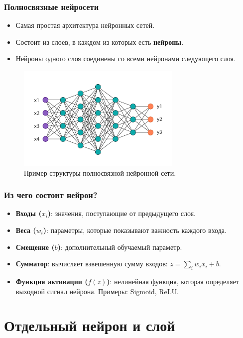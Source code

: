 \documentclass[notheorems, handout]{beamer}
\begin{document}
\begin{frame}
    \frametitle{Полносвязные нейросети}
    \begin{itemize}
        \item Самая простая архитектура нейронных сетей.
        \item Состоит из слоев, в каждом из которых есть \textbf{нейроны}.
        \item Нейроны одного слоя соединены со всеми нейронами следующего слоя.
    \end{itemize}
    \begin{figure}
        \includegraphics[width=0.7\textwidth]{img/fnn.png}
        \caption{Пример структуры полносвязной нейронной сети.}
    \end{figure}
\end{frame}

\begin{frame}
    \frametitle{Из чего состоит нейрон?}
    \begin{itemize}
        \item \textbf{Входы ($x_i$)}: значения, поступающие от предыдущего слоя.
        \item \textbf{Веса ($w_i$)}: параметры, которые показывают важность каждого входа.
        \item \textbf{Смещение ($b$)}: дополнительный обучаемый параметр.
        \item \textbf{Сумматор}: вычисляет взвешенную сумму входов: $z = \sum_{i} w_i x_i + b$.
        \item \textbf{Функция активации ($f(z)$)}: нелинейная функция, которая определяет выходной сигнал нейрона. Примеры: Sigmoid, ReLU.
    \end{itemize}
\end{frame}

\section{Отдельный нейрон и слой}
\end{document}
